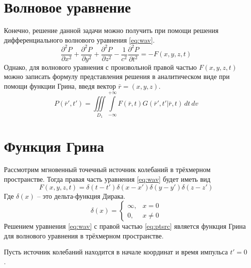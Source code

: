 \documentclass[a4paper, fontsize=14pt]{article}
\begin{document}
	\section{Волновое уравнение}
	Конечно, решение данной задачи можно получить при помощи решения
	дифференциального волнового уравнения \ref{eq:wav}. 
	\begin{equation}
		\frac{\partial^2 P}{\partial x^2} + \frac{\partial^2 P}{\partial y^2} +
		\frac{\partial^2 P}{\partial z^2} - \frac{1}{c^2} \frac{\partial^2 P}{\partial
			t^2} = -F(x,y,z,t)   
		\label{eq:wav}	
	\end{equation}
	Однако, для волнового уравнения с произвольной правой частью $F(x,y,z,t)$ можно
	записать формулу представления решения 
	в аналитическом виде при помощи функции Грина, введя вектор $\bar{r} = (x,y,z)$.
	\begin{equation}
		P(\bar{r}',t')=\iiint\limits_{D_1} \int\limits_{-\infty}^{+\infty}
		F(\bar{r},t) G(\bar{r}',t'|\bar{r},t)\,dt\,dv
	\end{equation}
	\section{Функция Грина} 
	
	Рассмотрим мгновенный точечный источник колебаний в трёхмерном пространстве.
	Тогда правая часть уравнения \ref{eq:wav} будет иметь вид \cite{zhdanov1988}
	\begin{equation}
		F(x,y,z,t) = \delta(t-t')\delta(x-x')\delta(y-y')\delta(z-z')
		\label{eq:ptsrc}
	\end{equation}
	Где $\delta(x)$ -- это дельта-функция Дирака.
	\begin{equation}
		\delta(x)=\begin{cases}
			\infty,&x=0\\
			0,&x\neq 0
		\end{cases}
		\label{eq:deltadef}
	\end{equation}	
	Решением уравнения \ref{eq:wav} с правой частью \ref{eq:ptsrc} является функция
	Грина для волнового уравнения в трёхмерном пространстве.
	
	Пусть источник колебаний находится в начале координат и время импульса $t' = 0$. 
	
\end{document}
